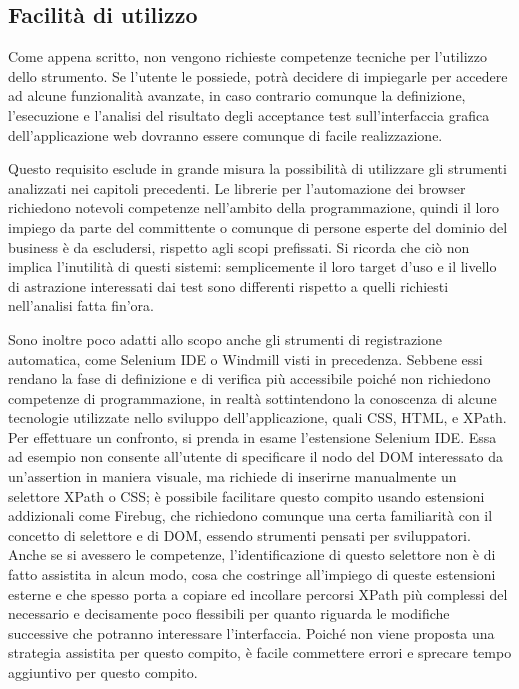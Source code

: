 \documentclass[12pt]{toptesi}
\begin{document}
\subsection{Facilità di utilizzo}

Come appena scritto, non vengono richieste competenze tecniche per l'utilizzo dello strumento. Se l'utente le possiede, potrà decidere di impiegarle per accedere ad alcune funzionalità avanzate, in caso contrario comunque la definizione, l'esecuzione e l'analisi del risultato degli acceptance test sull'interfaccia grafica dell'applicazione web dovranno essere comunque di facile realizzazione. 

Questo requisito esclude in grande misura la possibilità di utilizzare gli strumenti analizzati nei capitoli precedenti. Le librerie per l'automazione dei browser richiedono notevoli competenze nell'ambito della programmazione, quindi il loro impiego da parte del committente o comunque di persone esperte del dominio del business è da escludersi, rispetto agli scopi prefissati. Si ricorda che ciò non implica l'inutilità di questi sistemi: semplicemente il loro target d'uso e il livello di astrazione interessati dai test sono differenti rispetto a quelli richiesti nell'analisi fatta fin'ora. 

Sono inoltre poco adatti allo scopo anche gli strumenti di registrazione automatica, come Selenium IDE o Windmill visti in precedenza. Sebbene essi rendano la fase di definizione e di verifica più accessibile poiché non richiedono competenze di programmazione, in realtà sottintendono la conoscenza di alcune tecnologie utilizzate nello sviluppo dell'applicazione, quali CSS, HTML, e XPath. 
Per effettuare un confronto, si prenda in esame l'estensione Selenium IDE. Essa ad esempio non consente all'utente di specificare il nodo del DOM interessato da un'assertion in maniera visuale, ma richiede di inserirne manualmente un selettore XPath o CSS; è possibile facilitare questo compito usando estensioni addizionali come Firebug, che richiedono comunque una certa familiarità con il concetto di selettore e di DOM, essendo strumenti pensati per sviluppatori. Anche se si avessero le competenze, l'identificazione di questo selettore non è di fatto assistita in alcun modo, cosa che costringe all'impiego di queste estensioni esterne e che spesso porta a copiare ed incollare percorsi XPath più complessi del necessario e decisamente poco flessibili per quanto riguarda le modifiche successive che potranno interessare l'interfaccia. Poiché non viene proposta una strategia assistita per questo compito, è facile commettere errori e sprecare tempo aggiuntivo per questo compito. 
\end{document}
